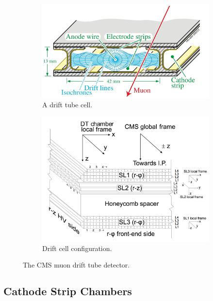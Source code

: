 \begin{figure}[hb!]
\centering
\begin{subfigure}[b]{0.475\textwidth}
\includegraphics[width=\textwidth]{figs/dtcell.png}
\caption{A drift tube cell.}
\label{fig:dtcell}
\end{subfigure}
\begin{subfigure}[b]{0.475\textwidth}
\includegraphics[width=\textwidth]{figs/superlayer.png}
\caption{Drift cell configuration.}
\label{fig:superlayer}
\end{subfigure}
\caption{The CMS muon drift tube detector.\cite{dtcellpic}}
\end{figure}

\subsection{Cathode Strip Chambers}


